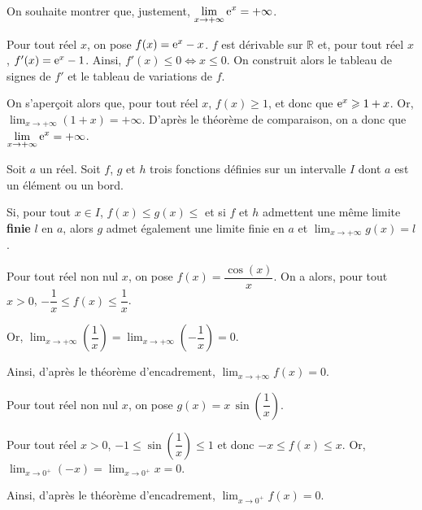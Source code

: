 \documentclass[11pt,fleqn, openany]{book} %
\begin{document}
\begin{example}On souhaite montrer que, justement, $\displaystyle \lim_{x \to +\infty}\mathrm{e}^x=+\infty$. 

Pour tout réel $x$, on pose $f(x)=\mathrm{e}^x-x$. $f$ est dérivable sur $\mathbb{R}$ et, pour tout réel $x$, $f'(x)=\mathrm{e}^x-1$. Ainsi, $f'(x)\leqslant 0 \Leftrightarrow x \leqslant 0$. On construit alors le tableau de signes de $f'$ et le tableau de variations de $f$.
\begin{center}
\end{center}

On s'aperçoit alors que, pour tout réel $x$, $f(x) \geqslant 1$, et donc que $\mathrm{e}^x \geqslant 1+x$. Or,  $\displaystyle \lim_{x \to +\infty} (1+x)=+\infty$. D'après le théorème de comparaison, on a donc que  $\displaystyle \lim_{x \to +\infty} \mathrm{e}^x = +\infty$.\end{example}

\newpage


\begin{theorem}Soit $a$ un réel. Soit $f$, $g$ et $h$ trois fonctions définies sur un intervalle $I$ dont $a$ est un élément ou un bord.

Si, pour tout $x\in I$, $f(x)\leqslant g(x)\leqslant$ et si $f$ et $h$ admettent une même limite \textbf{finie} $l$ en $a$, alors $g$ admet également une limite finie en $a$ et $\displaystyle \lim_{x \to +\infty} g(x)=l$.
\end{theorem}

\begin{example}Pour tout réel non nul $x$, on pose $f(x)=\dfrac{\cos(x)}{x}$. On a alors, pour tout $x>0$, $-\dfrac{1}{x} \leqslant f(x) \leqslant \dfrac{1}{x}$.

 Or, $\displaystyle \lim_{x \to +\infty} \left( \dfrac{1}{x}\right) =\displaystyle \lim_{x \to +\infty} \left(-\dfrac{1}{x}\right)=0$. 
 
 Ainsi, d'après le théorème d'encadrement, $\displaystyle \lim_{x \to +\infty}f(x)=0$.\end{example}
 
\begin{example}Pour tout réel non nul $x$, on pose $g(x)=x\,\sin\left(\dfrac{1}{x}\right)$.

Pour tout réel $x>0$, $-1\leqslant \sin\left(\dfrac{1}{x}\right)\leqslant 1$ et donc $-x \leqslant f(x) \leqslant x$. Or, $\displaystyle\lim_{x \to 0^+}(-x)=\displaystyle\lim_{x \to 0^+}x=0$. 

Ainsi, d'après le théorème d'encadrement, $\displaystyle\lim_{x \to 0^+}f(x)=0$.\end{example}
\end{document}
